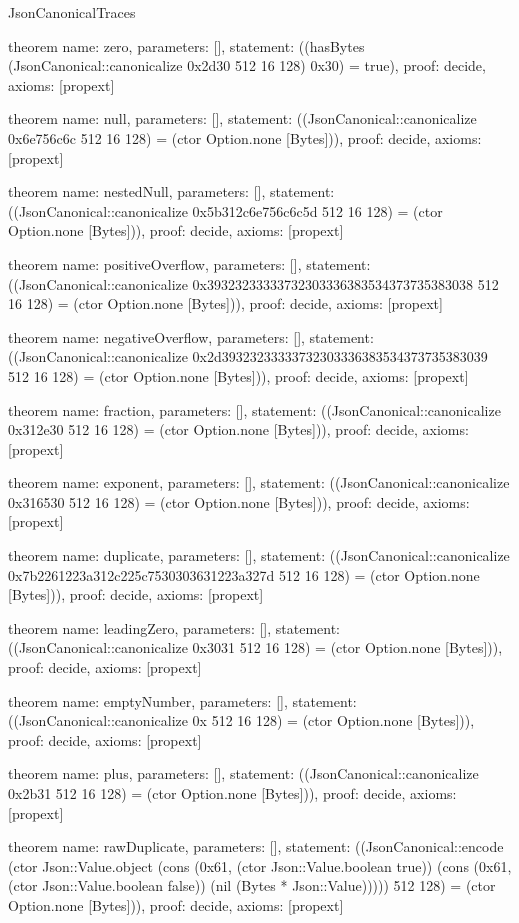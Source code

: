\begin{lexlean}{JsonCanonicalTraces}
\begin{semanticmodule}
theorem{
 name: zero,
 parameters: [],
 statement: ((hasBytes (JsonCanonical::canonicalize 0x2d30 512 16 128) 0x30) = true),
 proof: decide{},
 axioms: [propext]
}

theorem{
 name: null,
 parameters: [],
 statement: ((JsonCanonical::canonicalize 0x6e756c6c 512 16 128) = (ctor Option.none [Bytes])),
 proof: decide{},
 axioms: [propext]
}

theorem{
 name: nestedNull,
 parameters: [],
 statement: ((JsonCanonical::canonicalize 0x5b312c6e756c6c5d 512 16 128) = (ctor Option.none [Bytes])),
 proof: decide{},
 axioms: [propext]
}

theorem{
 name: positiveOverflow,
 parameters: [],
 statement: ((JsonCanonical::canonicalize 0x39323233333732303336383534373735383038 512 16 128) = (ctor Option.none [Bytes])),
 proof: decide{},
 axioms: [propext]
}

theorem{
 name: negativeOverflow,
 parameters: [],
 statement: ((JsonCanonical::canonicalize 0x2d39323233333732303336383534373735383039 512 16 128) = (ctor Option.none [Bytes])),
 proof: decide{},
 axioms: [propext]
}

theorem{
 name: fraction,
 parameters: [],
 statement: ((JsonCanonical::canonicalize 0x312e30 512 16 128) = (ctor Option.none [Bytes])),
 proof: decide{},
 axioms: [propext]
}

theorem{
 name: exponent,
 parameters: [],
 statement: ((JsonCanonical::canonicalize 0x316530 512 16 128) = (ctor Option.none [Bytes])),
 proof: decide{},
 axioms: [propext]
}

theorem{
 name: duplicate,
 parameters: [],
 statement: ((JsonCanonical::canonicalize 0x7b2261223a312c225c7530303631223a327d 512 16 128) = (ctor Option.none [Bytes])),
 proof: decide{},
 axioms: [propext]
}

theorem{
 name: leadingZero,
 parameters: [],
 statement: ((JsonCanonical::canonicalize 0x3031 512 16 128) = (ctor Option.none [Bytes])),
 proof: decide{},
 axioms: [propext]
}

theorem{
 name: emptyNumber,
 parameters: [],
 statement: ((JsonCanonical::canonicalize 0x 512 16 128) = (ctor Option.none [Bytes])),
 proof: decide{},
 axioms: [propext]
}

theorem{
 name: plus,
 parameters: [],
 statement: ((JsonCanonical::canonicalize 0x2b31 512 16 128) = (ctor Option.none [Bytes])),
 proof: decide{},
 axioms: [propext]
}

theorem{
 name: rawDuplicate,
 parameters: [],
 statement: ((JsonCanonical::encode (ctor Json::Value.object (cons (0x61, (ctor Json::Value.boolean true)) (cons (0x61, (ctor Json::Value.boolean false)) (nil (Bytes * Json::Value))))) 512 128) = (ctor Option.none [Bytes])),
 proof: decide{},
 axioms: [propext]
}


\end{semanticmodule}
\end{lexlean}
